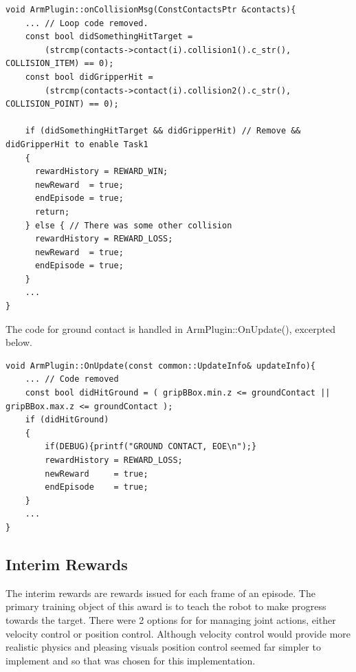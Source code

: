 \documentclass[10pt]{article}
\begin{document}
\begin{lstlisting}
void ArmPlugin::onCollisionMsg(ConstContactsPtr &contacts){
    ... // Loop code removed.
    const bool didSomethingHitTarget = 
        (strcmp(contacts->contact(i).collision1().c_str(), COLLISION_ITEM) == 0);
    const bool didGripperHit =
        (strcmp(contacts->contact(i).collision2().c_str(), COLLISION_POINT) == 0);

    if (didSomethingHitTarget && didGripperHit) // Remove && didGripperHit to enable Task1
    {
      rewardHistory = REWARD_WIN;
      newReward  = true;
      endEpisode = true;
      return;
    } else { // There was some other collision
      rewardHistory = REWARD_LOSS;
      newReward  = true;
      endEpisode = true;
    }
    ...
}
\end{lstlisting}

The code for ground contact is handled in ArmPlugin::OnUpdate(), excerpted below.

\begin{lstlisting}
void ArmPlugin::OnUpdate(const common::UpdateInfo& updateInfo){
    ... // Code removed
    const bool didHitGround = ( gripBBox.min.z <= groundContact || gripBBox.max.z <= groundContact );
    if (didHitGround)
    {
        if(DEBUG){printf("GROUND CONTACT, EOE\n");}
        rewardHistory = REWARD_LOSS;
        newReward     = true;
        endEpisode    = true;
    }
    ...
}
\end{lstlisting}


\subsection{Interim Rewards}
The interim rewards are rewards issued for each frame of an episode. The primary training object of this award
is to teach the robot to make progress towards the target. There were 2 options for for managing joint actions, 
either velocity control or position control. Although velocity control would provide more realistic physics
and pleasing visuals position control seemed far simpler to implement and so that was chosen for this implementation.
\end{document}

